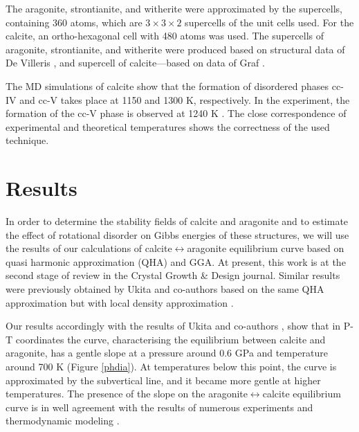 \documentclass[journal=jacsat,manuscript=article]{achemso}
\begin{document}
The aragonite, strontianite, and witherite were approximated by the supercells, containing 360 atoms, which are $3 \times 3 \times 2$ supercells of the unit cells used. For the calcite, an ortho-hexagonal cell with 480 atoms was used. The supercells of aragonite, strontianite, and witherite were produced based on structural data of De Villeris \cite{srco3}, and supercell of calcite---based on data of Graf \cite{calcite}.

The MD simulations of calcite show that the formation of disordered phases cc-IV and cc-V takes place at 1150 and 1300 K, respectively. In the experiment, the formation of the cc-V phase is observed at 1240 K \cite{ishizawa2013}. The close correspondence of experimental and theoretical temperatures shows the correctness of the used technique. 




			\section{Results}
In order to determine the stability fields of calcite and aragonite and to estimate the effect of rotational disorder on Gibbs energies of these structures, we will use the results of our calculations of calcite$\leftrightarrow$aragonite equilibrium curve based on quasi harmonic approximation (QHA) and GGA. At present, this work is at the second stage of review in the Crystal Growth \& Design journal. Similar results were previously obtained by Ukita and co-authors based on the same QHA approximation but with local density approximation \cite{ukita2016}.

Our results accordingly with the results of Ukita and co-authors \cite{ukita2016}, show that in P-T coordinates the curve, characterising the equilibrium between calcite and aragonite, has a gentle slope at a pressure around 0.6 GPa and temperature around 700 K (Figure \ref{phdia}). 
At temperatures below this point, the curve is approximated by the subvertical line, and it became more gentle at higher temperatures.
The presence of the slope on the aragonite$\leftrightarrow$calcite equilibrium curve is in well agreement with the results of numerous experiments and thermodynamic modeling \cite{mirwald1976, redfern2000}. 
\end{document}

